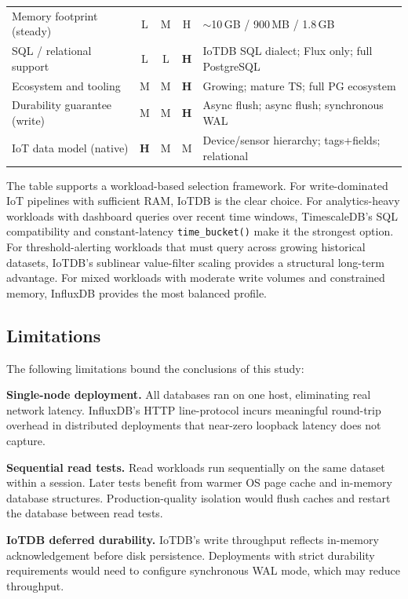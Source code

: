 \begin{table}[t]
\begin{tabular}{lcccl}
    Memory footprint (steady)     & L & M & H & $\sim$10\,GB / 900\,MB / 1.8\,GB \\
    SQL / relational support      & L & L & \textbf{H} & IoTDB SQL dialect; Flux only; full PostgreSQL \\
    Ecosystem and tooling         & M & M & \textbf{H} & Growing; mature TS; full PG ecosystem \\
    Durability guarantee (write)  & M & M & \textbf{H} & Async flush; async flush; synchronous WAL \\
    IoT data model (native)       & \textbf{H} & M & M & Device/sensor hierarchy; tags+fields; relational \\
    \hline
  \end{tabular}
\end{table}

The table supports a workload-based selection framework. For write-dominated IoT pipelines
with sufficient RAM, IoTDB is the clear choice. For analytics-heavy workloads with dashboard
queries over recent time windows, TimescaleDB's SQL compatibility and constant-latency
\texttt{time\_bucket()} make it the strongest option. For threshold-alerting workloads that
must query across growing historical datasets, IoTDB's sublinear value-filter scaling
provides a structural long-term advantage. For mixed workloads with moderate write volumes
and constrained memory, InfluxDB provides the most balanced profile.

\subsection{Limitations}
\label{sec:limitations}

The following limitations bound the conclusions of this study:

\textbf{Single-node deployment.} All databases ran on one host, eliminating real network
latency. InfluxDB's HTTP line-protocol incurs meaningful round-trip overhead in distributed
deployments that near-zero loopback latency does not capture.

\textbf{Sequential read tests.} Read workloads run sequentially on the same dataset within
a session. Later tests benefit from warmer OS page cache and in-memory database structures.
Production-quality isolation would flush caches and restart the database between read tests.

\textbf{IoTDB deferred durability.} IoTDB's write throughput reflects in-memory
acknowledgement before disk persistence. Deployments with strict durability requirements
would need to configure synchronous WAL mode, which may reduce throughput.

